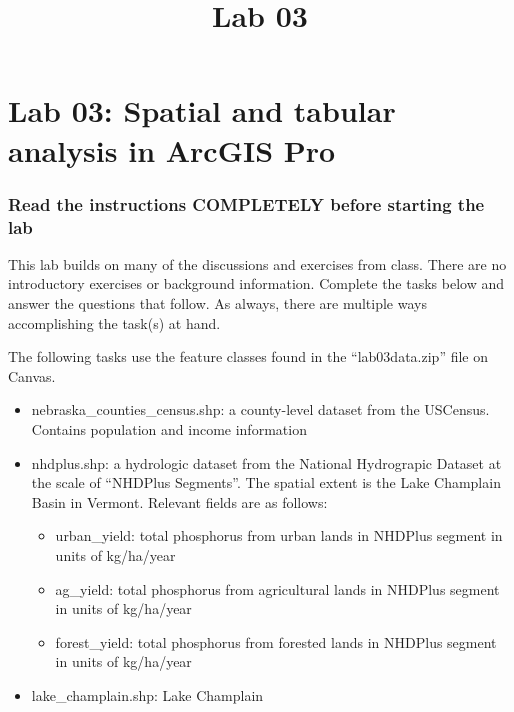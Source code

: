 \documentclass[]{article}
\title{Lab 03}
\author{}
\date{}
\makeatletter
\providecommand{\tightlist}{%
  \setlength{\itemsep}{0pt}\setlength{\parskip}{0pt}}
\renewcommand{\maketitle}{\bgroup\vspace*{-1cm}\setlength{\parindent}{0pt}
\begin{flushleft}
  \@author
  
  \@date
  
\end{flushleft}\egroup
}
\makeatother
\begin{document}
\maketitle

\hypertarget{lab-03-spatial-and-tabular-analysis-in-arcgis-pro}{%
\section{Lab 03: Spatial and tabular analysis in ArcGIS
Pro}\label{lab-03-spatial-and-tabular-analysis-in-arcgis-pro}}

\hypertarget{read-the-instructions-completely-before-starting-the-lab}{%
\subsubsection{Read the instructions COMPLETELY before starting the
lab}\label{read-the-instructions-completely-before-starting-the-lab}}

This lab builds on many of the discussions and exercises from class.
There are no introductory exercises or background information. Complete
the tasks below and answer the questions that follow. As always, there
are multiple ways accomplishing the task(s) at hand.

The following tasks use the feature classes found in the
``lab03data.zip'' file on Canvas.

\begin{itemize}
\tightlist
\item
  nebraska\_counties\_census.shp: a county-level dataset from the
  USCensus. Contains population and income information
\item
  nhdplus.shp: a hydrologic dataset from the National Hydrograpic
  Dataset at the scale of ``NHDPlus Segments''. The spatial extent is
  the Lake Champlain Basin in Vermont. Relevant fields are as follows:

  \begin{itemize}
  \tightlist
  \item
    urban\_yield: total phosphorus from urban lands in NHDPlus segment
    in units of kg/ha/year
  \item
    ag\_yield: total phosphorus from agricultural lands in NHDPlus
    segment in units of kg/ha/year
  \item
    forest\_yield: total phosphorus from forested lands in NHDPlus
    segment in units of kg/ha/year
  \end{itemize}
\item
  lake\_champlain.shp: Lake Champlain
\end{itemize}
\end{document}

